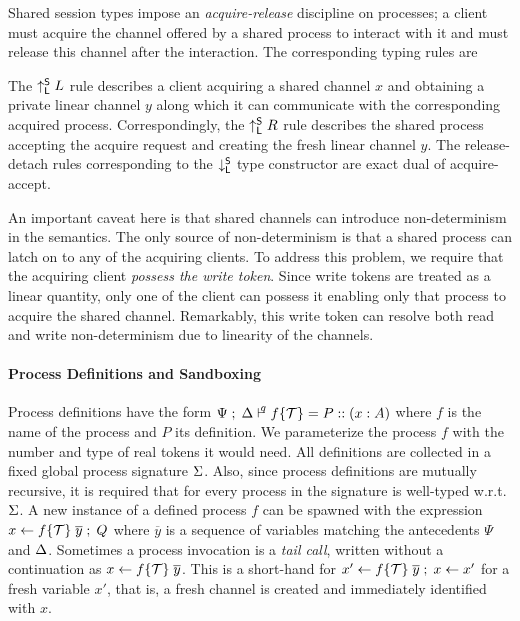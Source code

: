 Shared session types impose an \emph{acquire-release} discipline on processes; 
a client must acquire the channel offered by a shared process to interact with it
and must release this channel after the interaction.
The corresponding typing rules are
The $\up L$ rule describes a client acquiring a shared channel $x$
and obtaining a private linear channel $y$ along which it can communicate
with the corresponding acquired process.
Correspondingly, the $\up R$ rule describes the shared process
accepting the acquire request and creating the fresh linear channel $y$.
The release-detach rules corresponding to the $\down$ type constructor
are exact dual of acquire-accept.

An important caveat here is that shared channels can introduce non-determinism
in the semantics.
The only source of non-determinism is that a shared process can latch on to
any of the acquiring clients.
To address this problem, we require that the acquiring client \emph{possess
the write token}.
Since write tokens are treated as a linear quantity, only one of the client can
possess it enabling only that process to acquire the shared channel.
Remarkably, this write token can resolve both read and write non-determinism
due to linearity of the channels.


\paragraph*{\textbf{Process Definitions and Sandboxing}}
Process definitions have the form
$\Psi \semi \D \entailpot{q} f\{\Tokens\} = P :: (x : A)$ where $f$
is the name of the process and $P$ its definition.
We parameterize the process $f$ with the number and type of
real tokens it would need.
All definitions are collected in a fixed global process signature $\Sg$.
Also, since process definitions are mutually recursive, it is required that
for every process in the signature is well-typed w.r.t. $\Sg$.
A new instance of a defined process $f$ can be spawned with
the expression $\procdef{f\{\Tokens\}}{\overline{y}}{x} \semi Q$
where $\overline{y}$ is a sequence of variables matching the
antecedents $\Psi$ and $\D$.
Sometimes a process invocation is a \emph{tail call}, written without
a continuation as $\procdef{f\{\Tokens\}}{\overline{y}}{x}$.
This is a short-hand for
$\procdef{f\{\Tokens\}}{\overline{y}}{x'} \semi \fwd{x}{x'}$ for a
fresh variable $x'$, that is, a fresh channel is created and
immediately identified with $x$.

